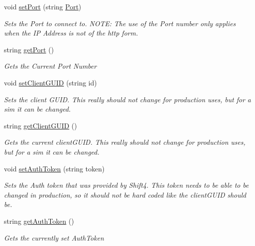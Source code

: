 \begin{DoxyCompactItemize}
void \mbox{\hyperlink{class_form_sim_1_1_generic_handler_ad22f25ee6f474e2ac46361add5ca7f97}{set\+Port}} (string \mbox{\hyperlink{class_form_sim_1_1_generic_handler_ac6492bb3e4fbe8f66c97b00bd27020c1}{Port}})
\begin{DoxyCompactList}\small\item\em Sets the Port to connect to. N\+O\+TE\+: The use of the Port number only applies when the IP Address is not of the http form. \end{DoxyCompactList}\item 
string \mbox{\hyperlink{class_form_sim_1_1_generic_handler_a0e6f8152a789ba9f82501d45b029de71}{get\+Port}} ()
\begin{DoxyCompactList}\small\item\em Gets the Current Port Number \end{DoxyCompactList}\item 
void \mbox{\hyperlink{class_form_sim_1_1_generic_handler_a3c934d9ba3f0efaadac331502ce0189c}{set\+Client\+G\+U\+ID}} (string id)
\begin{DoxyCompactList}\small\item\em Sets the client G\+U\+ID. This really should not change for production uses, but for a sim it can be changed. \end{DoxyCompactList}\item 
string \mbox{\hyperlink{class_form_sim_1_1_generic_handler_a16fe6657ef9d508f46dae9c8883a3a07}{get\+Client\+G\+U\+ID}} ()
\begin{DoxyCompactList}\small\item\em Gets the current client\+G\+U\+ID. This really should not change for production uses, but for a sim it can be changed. \end{DoxyCompactList}\item 
void \mbox{\hyperlink{class_form_sim_1_1_generic_handler_a905d080f02134e993d7afbb1dcc8f44b}{set\+Auth\+Token}} (string token)
\begin{DoxyCompactList}\small\item\em Sets the Auth token that was provided by Shift4. This token needs to be able to be changed in production, so it should not be hard coded like the client\+G\+U\+ID should be. \end{DoxyCompactList}\item 
string \mbox{\hyperlink{class_form_sim_1_1_generic_handler_a4854fdfe77d09a6d2af723d2811099f5}{get\+Auth\+Token}} ()
\begin{DoxyCompactList}\small\item\em Gets the currently set Auth\+Token \end{DoxyCompactList}\item 

\end{DoxyCompactItemize}
